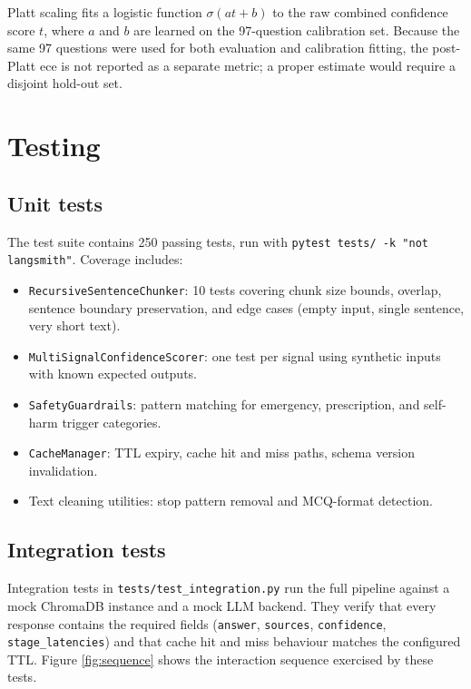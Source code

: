 Platt scaling fits a logistic function $\sigma(at + b)$ to the raw combined confidence score $t$, where $a$ and $b$ are learned on the 97-question calibration set. Because the same 97 questions were used for both evaluation and calibration fitting, the post-Platt \ac{ece} is not reported as a separate metric; a proper estimate would require a disjoint hold-out set.

\section{Testing}

\subsection{Unit tests}

The test suite contains 250 passing tests, run with \texttt{pytest tests/\allowbreak{} -k "not langsmith"}. Coverage includes:

\begin{itemize}
    \item \texttt{RecursiveSentenceChunker}: 10 tests covering chunk size bounds, overlap, sentence boundary preservation, and edge cases (empty input, single sentence, very short text).
    \item \texttt{MultiSignalConfidenceScorer}: one test per signal using synthetic inputs with known expected outputs.
    \item \texttt{SafetyGuardrails}: pattern matching for emergency, prescription, and self-harm trigger categories.
    \item \texttt{CacheManager}: TTL expiry, cache hit and miss paths, schema version invalidation.
    \item Text cleaning utilities: stop pattern removal and MCQ-format detection.
\end{itemize}

\subsection{Integration tests}

Integration tests in \texttt{tests/test\_integration.py} run the full pipeline against a mock ChromaDB instance and a mock LLM backend. They verify that every response contains the required fields (\texttt{answer}, \texttt{sources}, \texttt{confidence}, \texttt{stage\_latencies}) and that cache hit and miss behaviour matches the configured TTL. Figure \ref{fig:sequence} shows the interaction sequence exercised by these tests.

